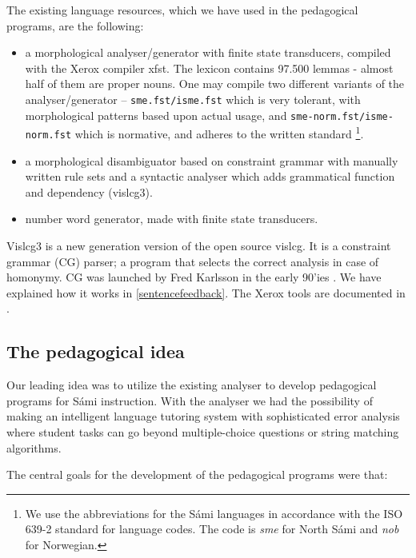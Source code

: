 \documentclass[11pt]{article}
\begin{document}
The existing language resources, which we have used in the pedagogical programs, are the following:

\begin{itemize}
\item a morphological analyser/generator with finite state transducers, compiled with the Xerox compiler xfst.  The lexicon contains 97.500 lemmas - almost half of them are proper nouns. One may compile two different variants of the analyser/generator -- \texttt{sme.fst/isme.fst} which is very tolerant, with morphological patterns based upon actual usage, and \texttt{sme-norm.fst/isme-norm.fst} which is normative, and adheres to the written standard \footnote{We use the abbreviations for the Sámi languages in accordance with the ISO 639-2 standard for language codes. The code is \textit{sme} for North Sámi and \textit{nob} for Norwegian.}.  
\item a morphological disambiguator based on constraint grammar with manually written rule sets and a syntactic analyser which adds grammatical function and dependency (vislcg3). 
\item number word generator, made with finite state transducers.
\end{itemize}

Vislcg3 is a new generation version of the open source vislcg. It is a constraint grammar (CG) parser; a program that selects the correct analysis in case of homonymy. CG was launched by Fred Karlsson in the early 90'ies \cite{Karlsson:95}. We have explained how it works in \ref{sentencefeedback}. The Xerox tools are documented in \cite{BeesleyKarttunen:03}.


\subsection{The pedagogical idea} \label{pedidea}

Our leading idea was to utilize the existing analyser to develop pedagogical programs for Sámi instruction.  With the analyser we had the possibility of making an intelligent language tutoring system with sophisticated error analysis where student tasks can go beyond multiple-choice questions or string matching algorithms. 

The central goals for the development of the pedagogical programs were that:
\end{document}
